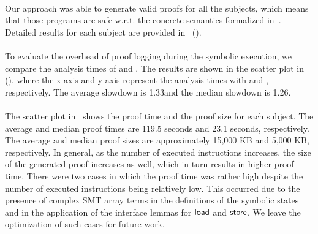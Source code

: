 \paragraph{\textbf{}}
Our approach was able to generate valid proofs for all the subjects,
which means that those programs are safe w.r.t. the concrete \llvm semantics formalized in~.
Detailed results for each subject are provided in~ ().

\paragraph{\textbf{}}
To evaluate the overhead of proof logging during the symbolic execution,
we compare the analysis times of \proofopt and \base.
The results are shown in the scatter plot in~ (),
where the x-axis and y-axis represent the analysis times with \base and \proofopt, respectively.
The average slowdown is 1.33\x and the median slowdown is 1.26\x.

\paragraph{\textbf{}}
The scatter plot in~ shows the proof time and the proof size for each subject.
The average and median proof times are 119.5 seconds and 23.1 seconds, respectively.
The average and median proof sizes are approximately 15,000 KB and 5,000 KB, respectively.
In general,
as the number of executed instructions increases,
the size of the generated proof increases as well,
which in turn results in higher proof time.
There were two cases in which the proof time was rather high despite the number of executed instructions being relatively low.
This occurred due to the presence of complex SMT array terms in the definitions of the symbolic states and in the application of the interface lemmas for $\textsf{load}$ and $\textsf{store}$.
We leave the optimization of such cases for future work.
